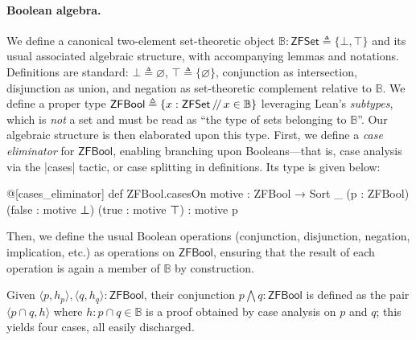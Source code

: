 \paragraph*{Boolean algebra.}
We define a canonical two-element set-theoretic object $\mathbb{B} : \mathsf{ZFSet} \triangleq \{\bot, \top\}$ and its usual associated algebraic structure, with accompanying lemmas and notations.
Definitions are standard: $\bot \triangleq \varnothing$, $\top \triangleq \{\varnothing\}$, conjunction as intersection, disjunction as union, and negation as set-theoretic complement relative to $\mathbb{B}$.
%
We define a proper type \mbox{$\mathsf{ZFBool} \triangleq \{ x : \mathsf{ZFSet}\, \slash\mkern-3mu\slash\,  x \in \mathbb{B} \}$} leveraging Lean's \emph{subtypes}, which is \emph{not} a set and must be read as ``the type of sets belonging to $\mathbb{B}$''.
%
%
Our algebraic structure is then elaborated upon this type.
First, we define a \emph{case eliminator}  for $\mathsf{ZFBool}$, enabling branching upon Booleans---that is, case analysis via the \inlinelean|cases| tactic, or case splitting in definitions.
Its type is given below:
%
\begin{leanlisting}
@[cases_eliminator]
def ZFBool.casesOn {motive : ZFBool → Sort _} (p : ZFBool)
  (false : motive ⊥) (true : motive ⊤) : motive p
\end{leanlisting}

Then, we define the usual Boolean operations (conjunction, disjunction, negation, implication, etc.) as operations on $\mathsf{ZFBool}$, ensuring that the result of each operation is again a member of $\mathbb{B}$ by construction.

\begin{definition}
  Given $\langle p, h_p \rangle, \langle q, h_q \rangle : \mathsf{ZFBool}$, their conjunction $p \bigwedge q : \mathsf{ZFBool}$ is defined as the pair $\langle p \cap q, h \rangle$ where $h : p \cap q \in \mathbb{B}$ is a proof obtained by case analysis on $p$ and $q$; this yields four cases, all easily discharged.
\end{definition}

